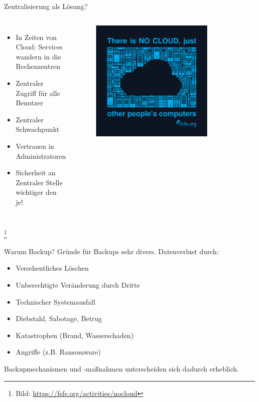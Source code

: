 \documentclass[10pt]{beamer}
\newcommand\blfootnote[1]{%
	\begingroup
	\renewcommand\thefootnote{}\footnote{#1}%
	\addtocounter{footnote}{-1}%
	\endgroup
}
\begin{document}
%
%
\begin{frame}[fragile]{Zentralisierung als Lösung?}
\begin{columns}[T,c,onlytextwidth]
	\begin{itemize}
		\item In Zeiten von Cloud: Services wandern in die Rechenzentren
		\item Zentraler Zugriff für alle Benutzer
		\item Zentraler Schwachpunkt
		\item Vertrauen in Administratoren
		\item Sicherheit an Zentraler Stelle wichtiger den je!
	\end{itemize}

 \begin{figure}
	\includegraphics[width=0.8\textwidth]{images/thereisnocloud-v2}
\end{figure}
\end{columns}
	\blfootnote{Bild: \href{https://fsfe.org/activities/nocloud}{https://fsfe.org/activities/nocloud}}
\end{frame}

%
%
\begin{frame}[fragile]{Warum Backup?}
Gründe für Backups sehr divers. Datenverlust durch:
	\begin{itemize}
	\item Versehentliches Löschen
	\item Unberechtigte Veränderung durch Dritte
	\item Technischer Systemausfall
	\item Diebstahl, Sabotage, Betrug
	\item Katastrophen (Brand, Wasserschaden)
	\item Angriffe (z.B. Ransomware)
\end{itemize}
Backupmechanismen und -maßnahmen unterscheiden sich dadurch erheblich.
\end{frame}
\end{document}
